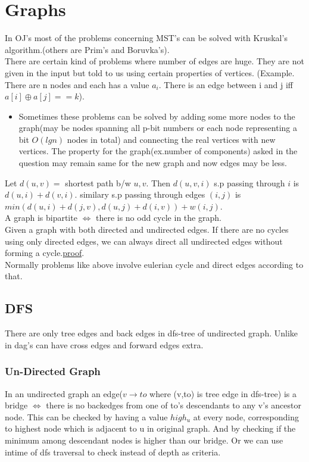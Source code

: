 \documentclass[../Notes.tex]{subfiles}
\begin{document}
\chapter{Graphs}

In OJ's most of the problems concerning MST's can be solved with Kruskal's algorithm.(others are Prim's and Boruvka's).\\ 

There are certain kind of problems where number of edges are huge. They are not given in the input but told to us using certain properties of vertices. (Example. There are n nodes and each has a value $a_{i}$. There is an edge between i and j iff $a[i]\oplus a[j]==k$).
\begin{itemize}
	\item Sometimes these problems can be solved by adding some more nodes to the graph(may be nodes spanning all p-bit numbers or each node representing a bit $O(lgn)$ nodes in total) and connecting the real vertices with new vertices. The property for the graph(ex.number of components) asked in the question may remain same for the new graph and now edges may be less.
\end{itemize}

Let $d(u,v) =$ shortest path b/w $u,v$. Then $d(u,v,i)$ s.p passing through $i$ is $d(u,i)+d(v,i)$. similary s.p passing through edges $(i,j)$ is $min(d(u,i)+d(j,v),d(u,j)+d(i,v))+w(i,j)$.\\

A graph is bipartite $\iff$ there is no odd cycle in the graph.\\

Given a graph with both directed and undirected edges. If there are no cycles using only directed edges, we can always direct all undirected edges without forming a cycle.\href{./Material/Making undirected edges direct.pdf}{proof}.\\
Normally problems like above involve eulerian cycle and direct edges according to that.\\


\section{DFS}
There are only tree edges and back edges in dfs-tree of undirected graph. Unlike in dag's can have cross edges and forward edges extra.\\

\subsection{Un-Directed Graph}
In an undirected graph an edge($v\rightarrow to$ where (v,to) is tree edge in dfs-tree) is a bridge $\iff$ there is no backedges from one of to's descendants to any v's ancestor node. This can be checked by having a value $high_u$ at every node, corresponding to highest node which is adjacent to u in original graph. And by checking if the minimum among descendant nodes is higher than our bridge. Or we can use intime of dfs traversal to check instead of depth as criteria.
\end{document}
